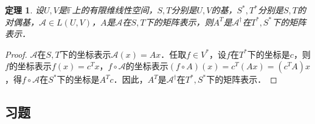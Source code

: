 \documentclass[a4paper,fontset=windows]{ctexbook}
\newtheorem{theorem}{定理}[chapter]
\theoremstyle{definition}
\begin{document}
\begin{theorem}\label{thm9.9}
设$U,V$是$\mathbb{F}$上的有限维线性空间，$S,T$分别是$U,V$的基，$S^*,T^*$分别是$S,T$的对偶基，$\mathcal{A}\in L(U,V)$，$A$是$\mathcal{A}$在$S,T$下的矩阵表示，则$A^T$是$\mathcal{A}^\dagger$在$T^*,S^*$下的矩阵表示．
\end{theorem}

\begin{proof}
$\mathcal{A}$在$S,T$下的坐标表示$\mathcal{A}(x)=Ax$．任取$f\in V^*$，设$f$在$T^*$下的坐标是$c$，则$f$的坐标表示$f(x)=c^Tx$，$f\circ\mathcal{A}$的坐标表示$(f\circ A)(x)=c^T(Ax)=(c^TA)x$，得$f\circ\mathcal{A}$在$S^*$下的坐标是$A^Tc$．因此，$A^T$是$\mathcal{A}^\dagger$在$T^*,S^*$下的矩阵表示．
\end{proof}

\subsection*{习题}
\end{document}
